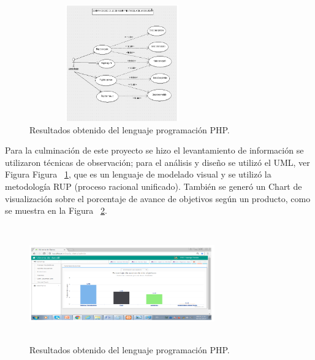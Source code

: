 \documentclass[10pt,journal]{IEEEtran}
\begin{document}
\begin{itemize}
        \begin{figure}[H]
      \begin{center}
        \includegraphics[width=8cm, height=5cm]{figuras/mininv2.PNG}
        \caption{Resultados obtenido del lenguaje programación PHP.}
        \label{mininv2} 
        \end{center}
    \end{figure} 
        
        Para la culminación de este proyecto se hizo el levantamiento de información se utilizaron técnicas de observación; para el análisis y diseño se utilizó el UML, ver Figura Figura ~\ref{mininv2}, que es un lenguaje de modelado visual y se utilizó la metodología RUP (proceso racional unificado). También se generó un Chart de visualización sobre el porcentaje de avance de objetivos según un producto, como se muestra en la Figura ~\ref{mininv3}.
        
            \begin{figure}[H]
      \begin{center}
        \includegraphics[width=8cm, height=5cm]{figuras/mininv3.PNG}
        \caption{Resultados obtenido del lenguaje programación PHP.}
        \label{mininv3} 
        \end{center}
    \end{figure} 
    \end{itemize}
\end{document}
